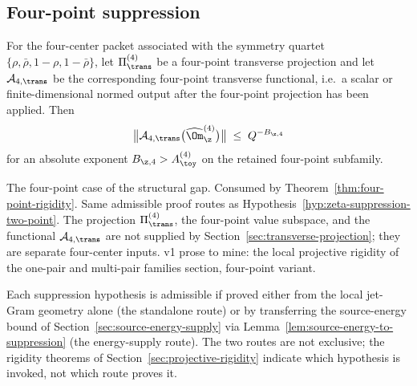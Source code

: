 \subsection{Four-point suppression}
\label{subsec:four-point-suppression}

\begin{hypothesis}
\label{hyp:zeta-suppression-four-point}
For the four-center packet associated with the symmetry quartet
\(\{\rho,\bar\rho,1-\rho,1-\bar\rho\}\), let
\(\Pi_\trans^{(4)}\) be a four-point transverse projection and let
\(\mathcal A_{4,\trans}\) be the corresponding four-point transverse
functional, i.e.\ a scalar or finite-dimensional normed output after
the four-point projection has been applied.  Then
\begin{equation}
\label{eq:zeta-suppression-four-point-transverse}
        \bigl\|\mathcal A_{4,\trans}\bigl(\widehat\Om_\z^{(4)}\bigr)\bigr\|
        \;\le\; Q^{-B_{\z,4}}
\end{equation}
for an absolute exponent \(B_{\z,4}>A_\toy^{(4)}\) on the retained
four-point subfamily.
\end{hypothesis}

\begin{wip}\label{rem:wip-zeta-suppression-four-point}
The four-point case of the structural gap.  Consumed by
Theorem~\ref{thm:four-point-rigidity}.  Same admissible proof routes
as Hypothesis~\ref{hyp:zeta-suppression-two-point}.  The projection
\(\Pi_\trans^{(4)}\), the four-point value subspace, and the
functional \(\mathcal A_{4,\trans}\) are not supplied by
Section~\ref{sec:transverse-projection}; they are separate
four-center inputs.  v1 prose to mine: the local projective rigidity
of the one-pair and multi-pair families section, four-point variant.
\end{wip}

\begin{remark}
\label{rem:zeta-suppression-routes}
Each suppression hypothesis is admissible if proved either from the
local jet-Gram geometry alone (the standalone route) or by
transferring the source-energy bound of
Section~\ref{sec:source-energy-supply} via
Lemma~\ref{lem:source-energy-to-suppression} (the energy-supply
route).  The two routes are not exclusive; the rigidity theorems of
Section~\ref{sec:projective-rigidity} indicate which hypothesis is
invoked, not which route proves it.
\end{remark}

